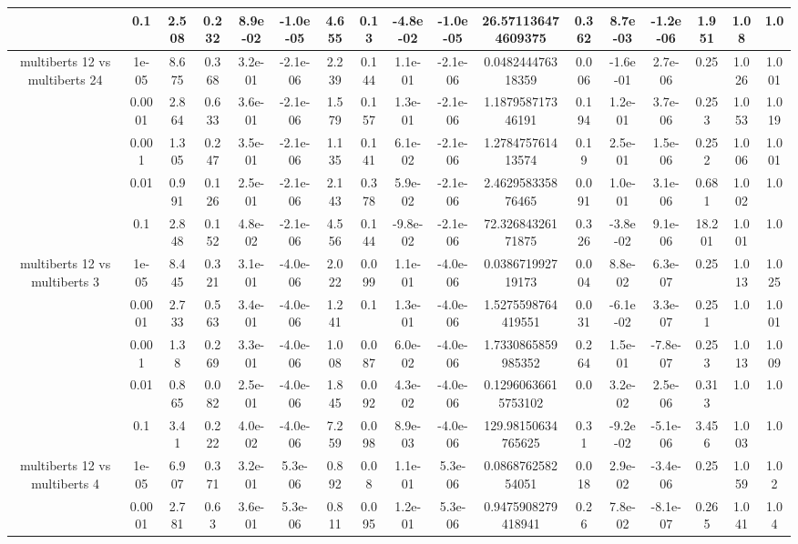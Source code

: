 \begin{tabular}{|c|c|c|c|c|c|c|c|c|c|c|c|c|c|c|c|c|}
 & 0.1 & 2.508 & 0.232 & 8.9e-02 & -1.0e-05 & 4.655 & 0.13 & -4.8e-02 & -1.0e-05 & 26.571136474609375 & 0.362 & 8.7e-03 & -1.2e-06 & 1.951 & 1.08 & 1.0 \\
\hline
\multirow{5}{*}{multiberts 12 vs multiberts 24} & 1e-05 & 8.675 & 0.368 & 3.2e-01 & -2.1e-06 & 2.239 & 0.144 & 1.1e-01 & -2.1e-06 & 0.048244476318359 & 0.006 & -1.6e-01 & 2.7e-06 & 0.25 & 1.026 & 1.001 \\
 & 0.0001 & 2.864 & 0.633 & 3.6e-01 & -2.1e-06 & 1.579 & 0.157 & 1.3e-01 & -2.1e-06 & 1.187958717346191 & 0.194 & 1.2e-01 & 3.7e-06 & 0.253 & 1.053 & 1.019 \\
 & 0.001 & 1.305 & 0.247 & 3.5e-01 & -2.1e-06 & 1.135 & 0.141 & 6.1e-02 & -2.1e-06 & 1.278475761413574 & 0.19 & 2.5e-01 & 1.5e-06 & 0.252 & 1.006 & 1.001 \\
 & 0.01 & 0.991 & 0.126 & 2.5e-01 & -2.1e-06 & 2.143 & 0.378 & 5.9e-02 & -2.1e-06 & 2.462958335876465 & 0.091 & 1.0e-01 & 3.1e-06 & 0.681 & 1.002 & 1.0 \\
 & 0.1 & 2.848 & 0.152 & 4.8e-02 & -2.1e-06 & 4.556 & 0.144 & -9.8e-02 & -2.1e-06 & 72.32684326171875 & 0.326 & -3.8e-02 & 9.1e-06 & 18.201 & 1.001 & 1.0 \\
\hline
\multirow{5}{*}{multiberts 12 vs multiberts 3} & 1e-05 & 8.445 & 0.321 & 3.1e-01 & -4.0e-06 & 2.022 & 0.099 & 1.1e-01 & -4.0e-06 & 0.038671992719173 & 0.004 & 8.8e-02 & 6.3e-07 & 0.25 & 1.013 & 1.025 \\
 & 0.0001 & 2.733 & 0.563 & 3.4e-01 & -4.0e-06 & 1.241 & 0.1 & 1.3e-01 & -4.0e-06 & 1.5275598764419551 & 0.031 & -6.1e-02 & 3.3e-07 & 0.251 & 1.0 & 1.001 \\
 & 0.001 & 1.38 & 0.269 & 3.3e-01 & -4.0e-06 & 1.008 & 0.087 & 6.0e-02 & -4.0e-06 & 1.7330865859985352 & 0.264 & 1.5e-01 & -7.8e-07 & 0.253 & 1.013 & 1.009 \\
 & 0.01 & 0.865 & 0.082 & 2.5e-01 & -4.0e-06 & 1.845 & 0.092 & 4.3e-02 & -4.0e-06 & 0.12960636615753102 & 0.0 & 3.2e-02 & 2.5e-06 & 0.313 & 1.0 & 1.0 \\
 & 0.1 & 3.41 & 0.222 & 4.0e-02 & -4.0e-06 & 7.259 & 0.098 & 8.9e-03 & -4.0e-06 & 129.98150634765625 & 0.31 & -9.2e-02 & -5.1e-06 & 3.456 & 1.003 & 1.0 \\
\hline
\multirow{5}{*}{multiberts 12 vs multiberts 4} & 1e-05 & 6.907 & 0.371 & 3.2e-01 & 5.3e-06 & 0.892 & 0.08 & 1.1e-01 & 5.3e-06 & 0.086876258254051 & 0.018 & 2.9e-02 & -3.4e-06 & 0.25 & 1.059 & 1.02 \\
 & 0.0001 & 2.781 & 0.63 & 3.6e-01 & 5.3e-06 & 0.811 & 0.095 & 1.2e-01 & 5.3e-06 & 0.9475908279418941 & 0.26 & 7.8e-02 & -8.1e-07 & 0.265 & 1.041 & 1.04 \\

\end{tabular}
